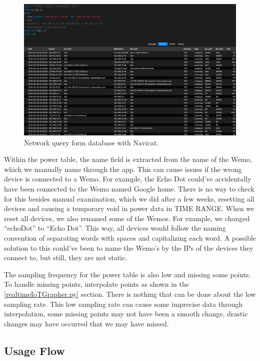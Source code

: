 \begin{figure}[H]
    \centering
    \includegraphics[width=1\textwidth]{figures/navicatNetworkQuery.png}
    \caption{Network query form database with Navicat.}
    \label{fig:navicatNetworkQuery}
\end{figure}
Within the power table, the name field is extracted from the name of the Wemo, which we manually name through the app. This can cause issues if the wrong device is connected to a Wemo. For example, the Echo Dot could've accidentally have been connected to the Wemo named Google home. There is no way to check for this besides manual examination, which we did after a few weeks, resetting all devices and causing a temporary void in power data in TIME RANGE. When we reset all devices, we also renamed some of the Wemos. For example, we changed ``echoDot'' to ``Echo Dot''. This way, all devices would follow the naming convention of separating words with spaces and capitalizing each word. A possible solution to this could've been to name the Wemo's by the IPs of the devices they connect to, but still, they are not static.

The sampling frequency for the power table is also low and missing some points. To handle missing points, interpolate points as shown in the \ref{realtimeIoTGrapher.py} section. There is nothing that can be done about the low sampling rate. This low sampling rate can cause some imprecise data through interpolation, some missing points may not have been a smooth change, drastic changes may have occurred that we may have missed.

\subsection{Usage Flow}

